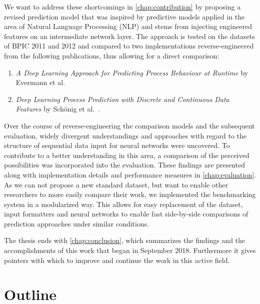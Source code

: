 We want to address these shortcomings in \autoref{chap:contribution} by proposing a revised prediction model that was inspired by predictive models applied in the area of Natural Language Processing (NLP) and stems from injecting engineered features on an intermediate network layer. The approach is tested on the datasets of BPIC 2011 and 2012 and compared to two implementations reverse-engineered from the following publications, thus allowing for a direct comparison:

\begin{enumerate}
    \item \textit{A Deep Learning Approach for Predicting Process Behaviour at Runtime} by Evermann et al.~\cite{evermann2016} \item\textit{Deep Learning Process Prediction with Discrete and Continuous Data Features} by Schönig et al.~\cite{schoenig2018}.
\end{enumerate}

Over the course of reverse-engineering the comparison models and the subsequent evaluation, widely divergent understandings and approaches with regard to the structure of sequential data input for neural networks were uncovered. To contribute to a better understanding in this area, a comparison of the perceived possibilities was incorporated into the evaluation. These findings are presented along with implementation details and performance measures in \autoref{chap:evaluation}. As we can not propose a new standard dataset, but want to enable other researchers to more easily compare their work, we implemented the benchmarking system in a modularized way. This allows for easy replacement of the dataset, input formatters and neural networks to enable fast side-by-side comparisons of prediction approaches under similar conditions.

The thesis ends with \autoref{chap:conclusion}, which summarizes the findings and the accomplishments of this work that began in September 2018. Furthermore it gives pointers with which to improve and continue the work in this active field.

\section{Outline}\label{sec:intro:outline}